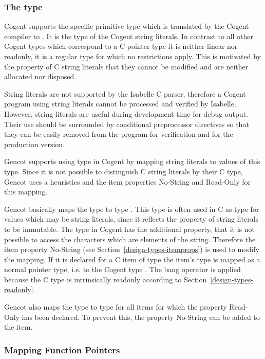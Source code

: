 \subsubsection{The  type}

Cogent supports the specific primitive type  which is translated by the Cogent compiler to .
It is the type of the Cogent string literals. In contrast to all other Cogent types which correspond to a C pointer
type it is neither linear nor readonly, it is a regular type for which no restrictions apply. This is motivated
by the property of C string literals that they cannot be modified and are neither allocated nor disposed.

String literals are not supported by the Isabelle C parser, therefore a Cogent program using string literals cannot
be processed and verified by Isabelle. However, string literals are useful during development time for debug 
output. Their use should be surrounded by conditional preprocessor directives so that they can be easily removed
from the program for verification and for the production version. 

Gencot supports using type  in Cogent by mapping string literals to values of this type.
Since it is not possible to distinguish C string literals by their C type, Gencot uses a heuristics and the item
properties No-String and Read-Only for this mapping.

Gencot basically maps the type  to type . This type is often used in C as type
for values which may be string literals, since it reflects the property of string literals to be immutable.
The  type in Cogent has the additional property, that it is not possible to access the characters
which are elements of the string. Therefore the item property No-String (see Section~\ref{design-types-itemprops})
is used to modify the mapping. If it is declared for a C item of type  the item's type is
mapped as a normal pointer type, i.e. to the Cogent type . The bang operator is applied because
the C type is intrinsically readonly according to Section~\ref{design-types-readonly}.

Gencot also maps the type  to type  for all items for which the property Read-Only has
been declared. To prevent this, the property No-String can be added to the item.

\subsubsection{Mapping Function Pointers}

